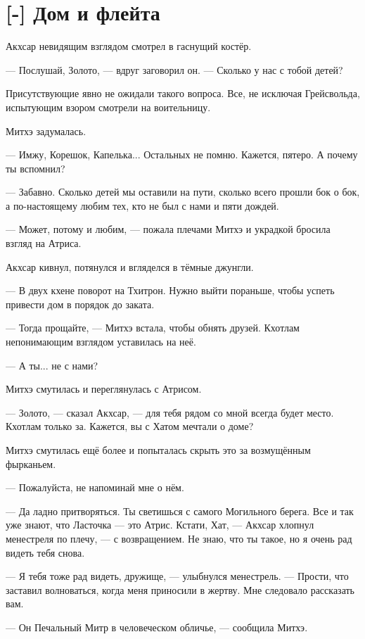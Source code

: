 \section{[-] Дом и флейта}

\textspace

Акхсар невидящим взглядом смотрел в гаснущий костёр.

--- Послушай, Золото, --- вдруг заговорил он.
--- Сколько у нас с тобой детей?

Присутствующие явно не ожидали такого вопроса.
Все, не исключая Грейсвольда, испытующим взором смотрели на воительницу.

Митхэ задумалась.

--- Имжу, Корешок, Капелька...
Остальных не помню.
Кажется, пятеро.
А почему ты вспомнил?

--- Забавно.
Сколько детей мы оставили на пути, сколько всего прошли бок о бок, а по-настоящему любим тех, кто не был с нами и пяти дождей.

--- Может, потому и любим, --- пожала плечами Митхэ и украдкой бросила взгляд на Атриса.

Акхсар кивнул, потянулся и вгляделся в тёмные джунгли.

--- В двух кхене поворот на Тхитрон.
Нужно выйти пораньше, чтобы успеть привести дом в порядок до заката.

--- Тогда прощайте, --- Митхэ встала, чтобы обнять друзей.
Кхотлам непонимающим взглядом уставилась на неё.

--- А ты... не с нами?

Митхэ смутилась и переглянулась с Атрисом.

--- Золото, --- сказал Акхсар, --- для тебя рядом со мной всегда будет место.
Кхотлам только за.
Кажется, вы с Хатом мечтали о доме?

Митхэ смутилась ещё более и попыталась скрыть это за возмущённым фырканьем.

--- Пожалуйста, не напоминай мне о нём.

--- Да ладно притворяться.
Ты светишься с самого Могильного берега.
Все и так уже знают, что Ласточка --- это Атрис.
Кстати, Хат, --- Акхсар хлопнул менестреля по плечу, --- с возвращением.
Не знаю, что ты такое, но я очень рад видеть тебя снова.

--- Я тебя тоже рад видеть, дружище, --- улыбнулся менестрель.
--- Прости, что заставил волноваться, когда меня приносили в жертву.
Мне следовало рассказать вам.

--- Он Печальный Митр в человеческом обличье, --- сообщила Митхэ.

